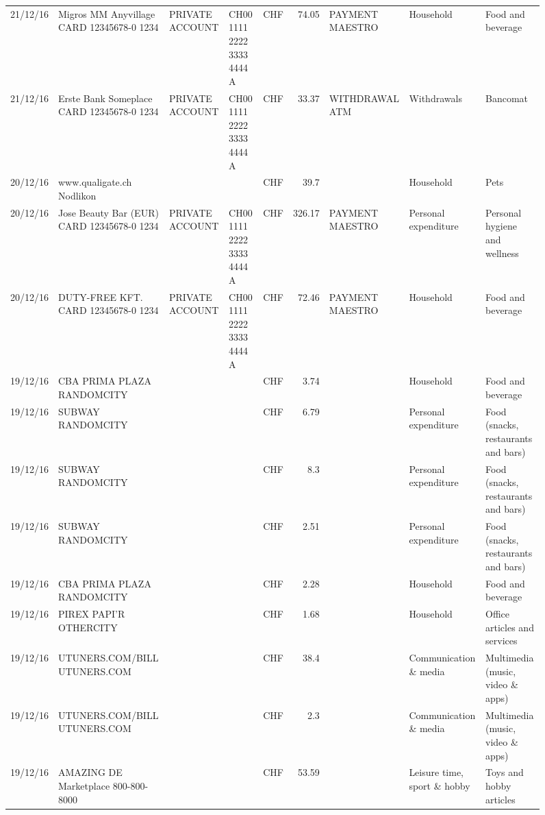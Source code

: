 \begin{landscape}
\begin{sidewaysfigure}
\begin{table}[h]
\begin{center}
\begin{tabular}{rllllrlll}
		21/12/16 & Migros MM Anyvillage CARD 12345678-0 1234 & PRIVATE ACCOUNT & CH00 1111 2222 3333 4444 A & CHF   & 74.05 & PAYMENT MAESTRO & Household & Food and beverage \\
		21/12/16 & Erste Bank Someplace CARD 12345678-0 1234 & PRIVATE ACCOUNT & CH00 1111 2222 3333 4444 A & CHF   & 33.37 & WITHDRAWAL ATM & Withdrawals & Bancomat \\
		20/12/16 & www.qualigate.ch          Nodlikon &       &       & CHF   & 39.7  &       & Household & Pets \\
		20/12/16 & Jose Beauty Bar (EUR) CARD 12345678-0 1234 & PRIVATE ACCOUNT & CH00 1111 2222 3333 4444 A & CHF   & 326.17 & PAYMENT MAESTRO & Personal expenditure & Personal hygiene and wellness \\
		20/12/16 & DUTY-FREE KFT. CARD 12345678-0 1234 & PRIVATE ACCOUNT & CH00 1111 2222 3333 4444 A & CHF   & 72.46 & PAYMENT MAESTRO & Household & Food and beverage \\
		19/12/16 & CBA PRIMA PLAZA        RANDOMCITY &       &       & CHF   & 3.74  &       & Household & Food and beverage \\
		19/12/16 & SUBWAY                   RANDOMCITY &       &       & CHF   & 6.79  &       & Personal expenditure & Food (snacks, restaurants and bars) \\
		19/12/16 & SUBWAY                   RANDOMCITY &       &       & CHF   & 8.3   &       & Personal expenditure & Food (snacks, restaurants and bars) \\
		19/12/16 & SUBWAY                   RANDOMCITY &       &       & CHF   & 2.51  &       & Personal expenditure & Food (snacks, restaurants and bars) \\
		19/12/16 & CBA PRIMA PLAZA        RANDOMCITY &       &       & CHF   & 2.28  &       & Household & Food and beverage \\
		19/12/16 & PIREX PAPI'R             OTHERCITY &       &       & CHF   & 1.68  &       & Household & Office articles and services \\
		19/12/16 & UTUNERS.COM/BILL          UTUNERS.COM &       &       & CHF   & 38.4  &       & Communication \& media & Multimedia (music, video \& apps) \\
		19/12/16 & UTUNERS.COM/BILL          UTUNERS.COM &       &       & CHF   & 2.3   &       & Communication \& media & Multimedia (music, video \& apps) \\
		19/12/16 & AMAZING DE Marketplace    800-800-8000 &       &       & CHF   & 53.59 &       & Leisure time, sport \& hobby & Toys and hobby articles \\

\end{tabular}
\end{center}
\end{table}
\end{sidewaysfigure}
\end{landscape}
